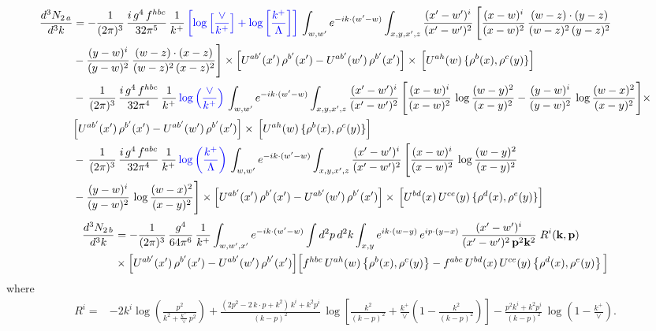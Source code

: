 \documentclass[9pt]{article}
\numberwithin{equation}{section}
\begin{document}
\begin{align}
    \frac{d^{3}N_{2\,a}}{d^{3}k} & = -\frac{1}{(2\pi)^{3}}\,\frac{i\,g^{4}\,f^{hbc}}{32\pi^{5}}\,\frac{1}{k^{+}}\,{\color{blue}\left[\log{\left[\frac{\vee}{k^{+}}\right]}+\log{\left[\frac{k^{+}}{\Lambda}\right]}\right]}\,
\int_{w,w'} e^{-ik\cdot(w'-w)}\int_{x,y,x',z}\frac{(x'-w')^{i}}{(x'-w')^{2}}\,\Bigg[\frac{(x-w)^{i}}{(x-w)^{2}}\, \frac{(w-z)\cdot (y-z)}{(w-z)^{2}\,(y-z)^{2}}\notag \\ & - \frac{(y-w)^{i}}{(y-w)^{2}}\, \frac{(w-z)\cdot (x-z)}{(w-z)^{2}\,(x-z)^{2}}\Bigg]\times\Big[U^{ab'}(x')\,\rho^{b'}(x')-U^{ab'}(w')\,\rho^{b'}(x')\Big]\times\, \Big[U^{ah}(w)\,\{\rho^{b}(x),\rho^{c}(y)\}\Big]\notag \\ & -\,\frac{1}{(2\pi)^{3}}\,\frac{i\,g^{4}\,f^{hbc}}{32\pi^{4}}\,\frac{1}{k^{+}}\,{\color{blue}\log\left(\frac{\vee}{k^{+}}\right)}\,
\int_{w,w'} e^{-ik\cdot(w'-w)}\int_{x,y,x',z}\frac{(x'-w')^{i}}{(x'-w')^{2}}\,\Bigg[\frac{(x-w)^{i}}{(x-w)^{2}}\,\log\frac{(w-y)^{2}}{(x-y)^{2}}-\frac{(y-w)^{i}}{(y-w)^{2}}\,\log\frac{(w-x)^{2}}{(x-y)^{2}}\Bigg]\times\notag \\ & \Big[U^{ab'}(x')\,\rho^{b'}(x')-U^{ab'}(w')\,\rho^{b'}(x')\Big]\times\, \Big[U^{ah}(w)\,\{\rho^{b}(x),\rho^{c}(y)\}\Big]\notag \\ & -\,\frac{1}{(2\pi)^{3}}\,\frac{i\,g^{4}\,f^{abc}}{32\pi^{4}}\,\frac{1}{k^{+}}\,{\color{blue}\log\left(\frac{k^{+}}{\Lambda}\right)}\,
\int_{w,w'} e^{-ik\cdot(w'-w)}\int_{x,y,x',z}\frac{(x'-w')^{i}}{(x'-w')^{2}}\,\Bigg[\frac{(x-w)^{i}}{(x-w)^{2}}\,\log\frac{(w-y)^{2}}{(x-y)^{2}}\notag \\ & -\frac{(y-w)^{i}}{(y-w)^{2}}\,\log\frac{(w-x)^{2}}{(x-y)^{2}}\Bigg]\times \Big[U^{ab'}(x')\,\rho^{b'}(x')-U^{ab'}(w')\,\rho^{b'}(x')\Big]\times\, \Big[U^{bd}(x)\,U^{ce}(y)\,\{\rho^{d}(x),\rho^{e}(y)\}\Big]
\end{align}
\begin{align}
\frac{d^{3}N_{2\,b}}{d^{3}k} & = -\frac{1}{(2\pi)^{3}}\,\frac{g^{4}}{64\pi^{6}}\,\frac{1}{k^{+}}\int_{w,w',x'} e^{-ik\cdot(w'-w)}
\int d^{2}p\,d^{2}k\int_{x,y} e^{ik\cdot(w-y)}\,e^{ip\cdot(y-x)}\,\frac{(x'-w')^{i}}{(x'-w')^{2}\,\mathbf{p}^{2}\mathbf{k}^{2}}\;R^{i}(\mathbf{k},\mathbf{p})\notag\\
&\times\Big[U^{ab'}(x')\,\rho^{b'}(x')-U^{ab'}(w')\,\rho^{b'}(x')\Big]
\Big[f^{hbc}\,U^{ah}(w)\left\{\rho^{b}(x),\rho^{c}(y)\right\}-f^{abc}\,U^{bd}(x)\,U^{ce}(y)\left\{\rho^{d}(x),\rho^{e}(y)\right\}\Big]
\end{align}
where
\begin{align}
R^{i} =& -2k^{i}\log\left(\frac{p^{2}}{k^{2}+\frac{k^{+}}{\vee}\,p^{2}}\right)
+\frac{(2p^{2}-2\,k\cdot p+k^{2})\,k^{i}+k^{2}p^{i}}{(k-p)^{2}}\,
\log\left[\frac{k^{2}}{(k-p)^{2}}+\frac{k^{+}}{\vee}\left(1-\frac{k^{2}}{(k-p)^{2}}\right)\right]
-\frac{p^{2}k^{i}+k^{2}p^{i}}{(k-p)^{2}}\,\log\left(1-\frac{k^{+}}{\vee}\right).
\end{align}
\end{document}

